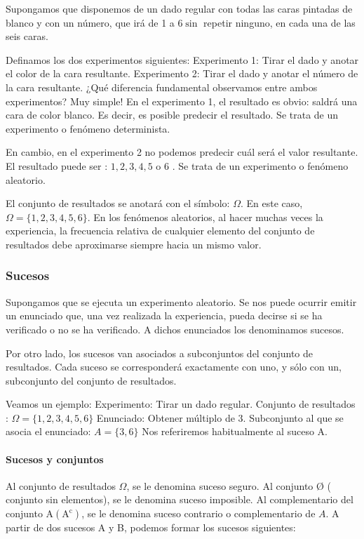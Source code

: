 \documentclass[
]{article}
\begin{document}
Supongamos que disponemos de un dado regular con todas las caras
pintadas de blanco y con un número, que irá de 1 a \(6 \sin\) repetir
ninguno, en cada una de las seis caras.

Definamos los dos experimentos siguientes: Experimento 1: Tirar el dado
y anotar el color de la cara resultante. Experimento 2: Tirar el dado y
anotar el número de la cara resultante. ¿Qué diferencia fundamental
observamos entre ambos experimentos? Muy simple! En el experimento 1, el
resultado es obvio: saldrá una cara de color blanco. Es decir, es
posible predecir el resultado. Se trata de un experimento o fenómeno
determinista.

En cambio, en el experimento 2 no podemos predecir cuál será el valor
resultante. El resultado puede ser : \(1,2,3,4,5\) o 6 . Se trata de un
experimento o fenómeno aleatorio.

El conjunto de resultados se anotará con el símbolo: \(\Omega\). En este
caso, \(\Omega=\{1,2,3,4,5,6\}\). En los fenómenos aleatorios, al hacer
muchas veces la experiencia, la frecuencia relativa de cualquier
elemento del conjunto de resultados debe aproximarse siempre hacia un
mismo valor.

\subsubsection{Sucesos}\label{sucesos}

Supongamos que se ejecuta un experimento aleatorio. Se nos puede ocurrir
emitir un enunciado que, una vez realizada la experiencia, pueda decirse
si se ha verificado o no se ha verificado. A dichos enunciados los
denominamos sucesos.

Por otro lado, los sucesos van asociados a subconjuntos del conjunto de
resultados. Cada suceso se corresponderá exactamente con uno, y sólo con
un, subconjunto del conjunto de resultados.

Veamos un ejemplo: Experimento: Tirar un dado regular. Conjunto de
resultados : \(\Omega=\{1,2,3,4,5,6\}\) Enunciado: Obtener múltiplo de 3.
Subconjunto al que se asocia el enunciado: \(A=\{3,6\}\) Nos referiremos
habitualmente al suceso A.

\paragraph{Sucesos y conjuntos}\label{sucesos-y-conjuntos}

Al conjunto de resultados \(\Omega\), se le denomina suceso seguro. Al
conjunto Ø ( conjunto sin elementos), se le denomina suceso imposible.
Al complementario del conjunto
\(\mathrm{A}\left(\mathrm{A}^{\mathrm{c}}\right)\), se le denomina suceso
contrario o complementario de \(A\). A partir de dos sucesos A y B,
podemos formar los sucesos siguientes:
\end{document}
